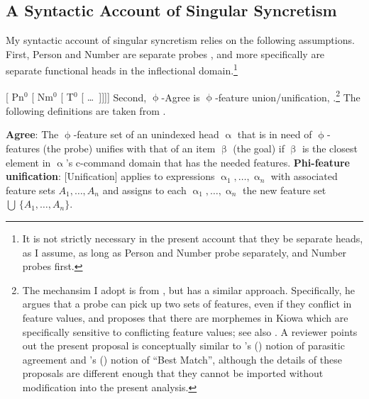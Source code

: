 \documentclass[output=paper,colorlinks,citecolor=brown,
]{langscibook}
\def\exattr#1{\hfill{} #1}
\begin{document}



\subsection{A Syntactic Account of Singular \sti Syncretism}	


My syntactic account of singular \sti syncretism relies on the following assumptions. First, Person and Number are separate probes \citep{SigurTHsson:2008dm,Bejar:2008sw}, and more specifically are separate functional heads in the inflectional domain.\footnote{It is not strictly necessary in the present account that they be separate heads, as I assume, as long as Person and Number probe separately, and Number probes first.}

\ea
    { [ Pn$^0$ [ Nm$^0$ [ T$^0$ [ \dots\ ]]]] }
\z
Second, $\upphi$-Agree is $\upphi$-feature union/unification, \citep{Kratzer:2009jq,Harbour:2009mh}.\footnote{The mechansim I adopt is from \cite{Kratzer:2009jq}, but \cite{Harbour:2009mh} has a similar approach. Specifically, he argues that a probe can pick up two sets of features, even if they conflict in feature values, and proposes that there are morphemes in Kiowa which are specifically sensitive to conflicting feature values; see also \cite{oxford2019inverse}. A reviewer points out the present proposal is conceptually similar to \citeauthor{kotek2014wh}'s (\citeyear{kotek2014wh})  notion of parasitic agreement and \citeauthor{vanUrk2015}'s (\citeyear{vanUrk2015}) notion of ``Best Match'', although the details of these proposals are different enough that they cannot be imported without modification into the present analysis.} The following definitions are taken from \cite{Kratzer:2009jq}.




\ea 
    \ea \textbf{Agree}: The $\upphi$-feature set of an unindexed head $\upalpha$ that is in need of $\upphi $-features (the probe) unifies with that of an item $\upbeta$ (the goal) if $\upbeta$ is the closest element in $\upalpha$'s c-command domain that has the needed features. 
    \exattr{ \mbox{\cite[197]{Kratzer:2009jq}}}%
    \ex \textbf{Phi-feature unification}: [Unification] applies to expressions 
    $\upalpha_1, \dots, \upalpha_n$ with associated feature sets $A_1, \dots, A_n$ and 
    assigns to each $\upalpha_1, \dots, \upalpha_n$  the new feature set 
    $\bigcup\,\{A_1, \dots, A_n\}$.
    \exattr{\cite[195]{Kratzer:2009jq}} %
    \z
\z
\end{document}
